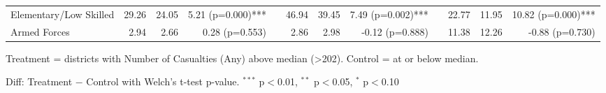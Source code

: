 \begin{table}[htbp]
\begin{tabular}{l rrr c rrr c rrr}
\quad Elementary/Low Skilled & 29.26 & 24.05 & 5.21 (p=0.000)*** &  & 46.94 & 39.45 & 7.49 (p=0.002)*** &  & 22.77 & 11.95 & 10.82 (p=0.000)*** \\
\quad Armed Forces & 2.94 & 2.66 & 0.28 (p=0.553) &  & 2.86 & 2.98 & -0.12 (p=0.888) &  & 11.38 & 12.26 & -0.88 (p=0.730) \\
\bottomrule
\end{tabular}
\begin{tablenotes}
\small
\item Treatment = districts with Number of Casualties (Any) above median (>202). Control = at or below median.
\item Diff: Treatment $-$ Control with Welch's t-test p-value. $^{{***}}$ p$<$0.01, $^{{**}}$ p$<$0.05, $^{{*}}$ p$<$0.10
\end{tablenotes}
\end{table}

\clearpage

